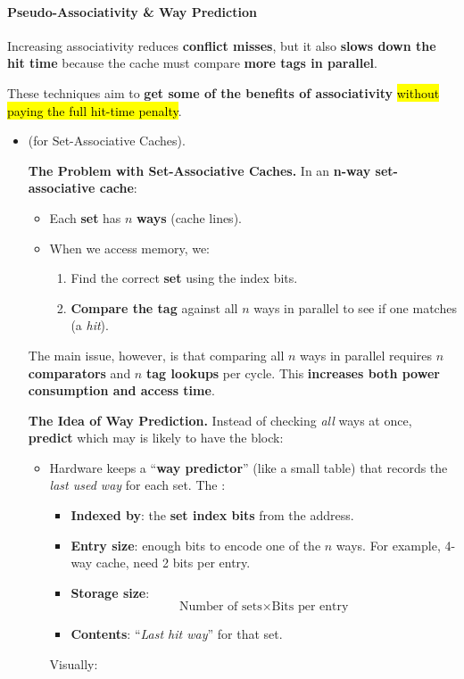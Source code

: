 \paragraph{Pseudo-Associativity \& Way Prediction}\label{paragraph: Pseudo-Associativity and Way Prediction}

Increasing associativity reduces \textbf{conflict misses}, but it also \textbf{slows down the hit time} because the cache must compare \textbf{more tags in parallel}.

\highspace
These techniques aim to \textbf{get some of the benefits of associativity} \hl{without paying the full hit-time penalty}.
\begin{itemize}
    \item {} (for Set-Associative Caches).
    
    \textcolor{Red2}{ \textbf{The Problem with Set-Associative Caches.}} In an \textbf{n-way set-associative cache}:
    \begin{itemize}
        \item Each \textbf{set} has $n$ \textbf{ways} (cache lines).
        \item When we access memory, we:
        \begin{enumerate}
            \item Find the correct \textbf{set} using the index bits.
            \item \textbf{Compare the tag} against all $n$ ways in parallel to see if one matches (a \emph{hit}).
        \end{enumerate}
    \end{itemize}
    The main issue, however, is that comparing all $n$ ways in parallel requires $n$ \textbf{comparators} and $n$ \textbf{tag lookups} per cycle. This \textbf{increases both power consumption and access time}.

    \textcolor{Green3}{ \textbf{The Idea of Way Prediction.}} Instead of checking \emph{all} ways at once, \textbf{predict} which may is likely to have the block:
    \begin{itemize}
        \item Hardware keeps a ``\textbf{way predictor}'' (like a small table) that records the \emph{last used way} for each set. The :
        \begin{itemize}
            \item \textbf{Indexed by}: the \textbf{set index bits} from the address.
            \item \textbf{Entry size}: enough bits to encode one of the $n$ ways. For example, 4-way cache, need 2 bits per entry.
            \item \textbf{Storage size}:
            \begin{equation*}
                \text{Number of sets} \times \text{Bits per entry}
            \end{equation*}
            \item \textbf{Contents}: ``\emph{Last hit way}'' for that set.
        \end{itemize}
        Visually:


\end{itemize}
\end{itemize}
